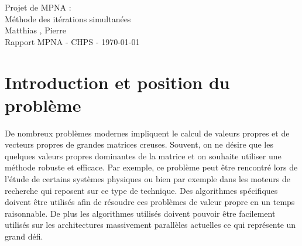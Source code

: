 \documentclass[11pt,a4paper]{article}
\begin{document}
\begin{center}

	{\LARGE\centering Projet de MPNA :\\ Méthode des itérations simultanées}\\[1cm]

	{ Matthias , Pierre }\\[0.5cm]
	{Rapport MPNA - CHPS - \today}\\[2cm]
\end{center}

\tableofcontents
\newpage

\section{Introduction et position du problème}
	De nombreux problèmes modernes impliquent le calcul de valeurs propres et de vecteurs propres de grandes matrices creuses. Souvent, on ne désire que les quelques valeurs propres dominantes de la matrice et on souhaite utiliser une méthode robuste et efficace. Par exemple, ce problème peut être rencontré lors de l'étude de certains systèmes physiques ou bien par exemple dans les moteurs de recherche qui reposent sur ce type de technique. Des algorithmes spécifiques doivent être utilisés afin de résoudre ces problèmes de valeur propre en un temps raisonnable. De plus les algorithmes utilisés doivent pouvoir être facilement utilisés sur les architectures massivement parallèles actuelles ce qui représente un grand défi.
\end{document}
